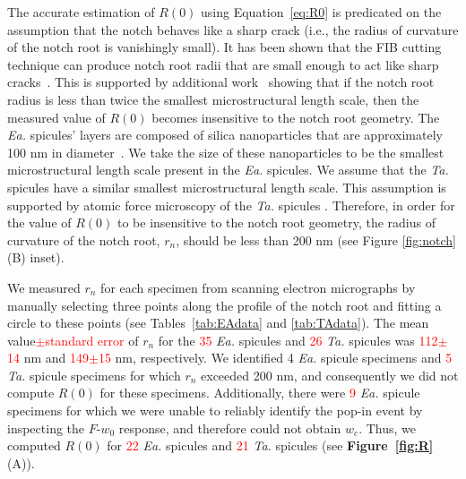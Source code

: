 \documentclass[12pt,onecolumn]{article}
\makeatletter
\newcommand{\TA}{\textit{Ta.\@}\xspace}
\newcommand{\EA}{\textit{Ea.\@}\xspace}
\makeatother
\begin{document}
\begin{bibunit}
The accurate estimation of $R(0)$ using Equation~\eqref{eq:R0} is predicated on the assumption that the notch behaves like a sharp crack (i.e., the radius of curvature of the notch root is vanishingly small). It has been shown that the FIB cutting technique can produce notch root radii that are small enough to act like sharp cracks~\cite{fett2008fracture}. This is supported by additional work~\cite{kubler1997fracture} showing that if the notch root radius is less than twice the smallest microstructural length scale, then the measured value of $R(0)$ becomes insensitive to the notch root geometry. The \EA spicules' layers are composed of silica nanoparticles that are approximately 100 nm in diameter~\cite{aizenberg2005skeleton}. We take the size of these nanoparticles to be the smallest microstructural length scale present in the \EA spicules. We assume that the \TA spicules have a similar smallest microstructural length scale. This assumption is supported by atomic force microscopy of the \TA spicules \cite{weaver2003nanostructural}. Therefore, in order for the value of $R(0)$ to be insensitive to the notch root geometry, the radius of curvature of the notch root, $r_n$, should be less than 200 nm (see Figure \ref{fig:notch} (B) inset). 

We measured $r_n$ for each specimen from scanning electron micrographs by manually selecting three points along the profile of the notch root and fitting a circle to these points (see Tables~\ref{tab:EAdata} and \ref{tab:TAdata}). The mean value\textcolor{red}{$\pm$standard error} of $r_n$ for the \textcolor{red}{35} \EA spicules and \textcolor{red}{26} \TA spicules was \textcolor{red}{112$\pm$14} nm and \textcolor{red}{149$\pm$15} nm, respectively. We identified 4 \EA spicule specimens and \textcolor{red}{5} \TA spicule specimens for which $r_n$ exceeded 200 nm, and consequently we did not compute $R(0)$ for these specimens. Additionally, there were \textcolor{red}{9} \EA spicule specimens for which we were unable to reliably identify the pop-in event by inspecting the $F$-$w_0$ response, and therefore could not obtain $w_c$. Thus, we computed $R(0)$ for \textcolor{red}{22} \EA spicules and \textcolor{red}{21} \TA spicules (see {\bf Figure~\ref{fig:R}} (A)).


\end{bibunit}
\end{document}
